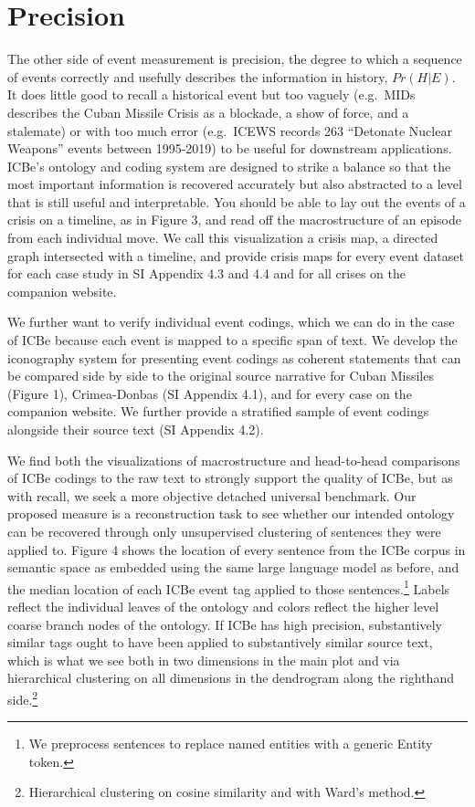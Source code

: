 \documentclass{article}
\begin{document}
\hypertarget{precision}{%
\section{Precision}\label{precision}}

The other side of event measurement is precision, the degree to which a
sequence of events correctly and usefully describes the information in
history, \(Pr(H|E)\). It does little good to recall a historical event
but too vaguely (e.g.~MIDs describes the Cuban Missile Crisis as a
blockade, a show of force, and a stalemate) or with too much error
(e.g.~ICEWS records 263 ``Detonate Nuclear Weapons'' events between
1995-2019) to be useful for downstream applications. ICBe's ontology and
coding system are designed to strike a balance so that the most
important information is recovered accurately but also abstracted to a
level that is still useful and interpretable. You should be able to lay
out the events of a crisis on a timeline, as in Figure 3, and read off
the macrostructure of an episode from each individual move. We call this
visualization a crisis map, a directed graph intersected with a
timeline, and provide crisis maps for every event dataset for each case
study in SI Appendix 4.3 and 4.4 and for all crises on the companion
website.

We further want to verify individual event codings, which we can do in
the case of ICBe because each event is mapped to a specific span of
text. We develop the iconography system for presenting event codings as
coherent statements that can be compared side by side to the original
source narrative for Cuban Missiles (Figure 1), Crimea-Donbas (SI
Appendix 4.1), and for every case on the companion website. We further
provide a stratified sample of event codings alongside their source text
(SI Appendix 4.2).

We find both the visualizations of macrostructure and head-to-head
comparisons of ICBe codings to the raw text to strongly support the
quality of ICBe, but as with recall, we seek a more objective detached
universal benchmark. Our proposed measure is a reconstruction task to
see whether our intended ontology can be recovered through only
unsupervised clustering of sentences they were applied to. Figure 4
shows the location of every sentence from the ICBe corpus in semantic
space as embedded using the same large language model as before, and the
median location of each ICBe event tag applied to those
sentences.\footnote{We preprocess sentences to replace named entities
  with a generic Entity token.} Labels reflect the individual leaves of
the ontology and colors reflect the higher level coarse branch nodes of
the ontology. If ICBe has high precision, substantively similar tags
ought to have been applied to substantively similar source text, which
is what we see both in two dimensions in the main plot and via
hierarchical clustering on all dimensions in the dendrogram along the
righthand side.\footnote{Hierarchical clustering on cosine similarity
  and with Ward's method.}
\end{document}

